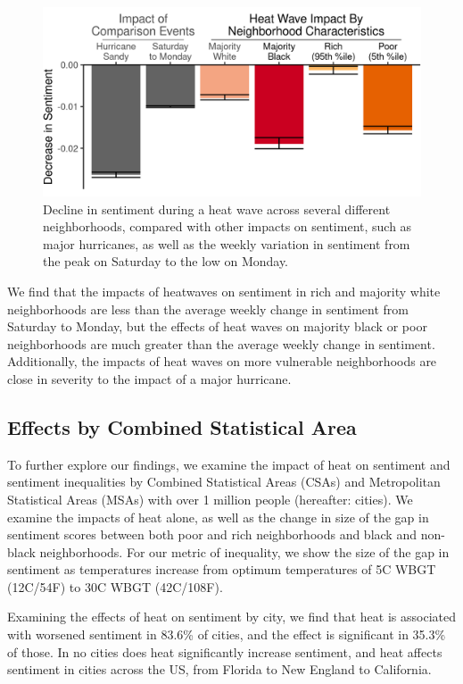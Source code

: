 \documentclass[fleqn,10pt]{wlscirep}
\begin{document}
\begin{figure}[H]
  \centering
  \includegraphics[width=0.66\linewidth]{../res/comparison_plot.png}
  \caption{Decline in sentiment during a heat wave across several different neighborhoods, compared with other impacts on sentiment, such as major hurricanes, as well as the weekly variation in sentiment from the peak on Saturday to the low on Monday.}
  \label{fig:compare}
\end{figure}

We find that the impacts of heatwaves on sentiment in rich and majority white neighborhoods are less than the average weekly change in sentiment from Saturday to Monday, but the effects of heat waves on majority black or poor neighborhoods are much greater than the average weekly change in sentiment.  Additionally, the impacts of heat waves on more vulnerable neighborhoods are close in severity to the impact of a major hurricane.

\subsection*{Effects by Combined Statistical Area}

To further explore our findings, we examine the impact of heat on sentiment and sentiment inequalities by Combined Statistical Areas (CSAs) and Metropolitan Statistical Areas (MSAs) with over 1 million people (hereafter: cities).  We examine the impacts of heat alone, as well as the change in size of the gap in sentiment scores between both poor and rich neighborhoods and black and non-black neighborhoods.  For our metric of inequality, we show the size of the gap in sentiment as temperatures increase from optimum temperatures of 5\textdegree C WBGT (12\textdegree C/54\textdegree F) to 30\textdegree C WBGT (42\textdegree C/108\textdegree F).

Examining the effects of heat on sentiment by city, we find that heat is associated with worsened sentiment in 83.6\% of cities, and the effect is significant in 35.3\% of those.  In no cities does heat significantly increase sentiment, and heat affects sentiment in cities across the US, from Florida to New England to California.
\end{document}
